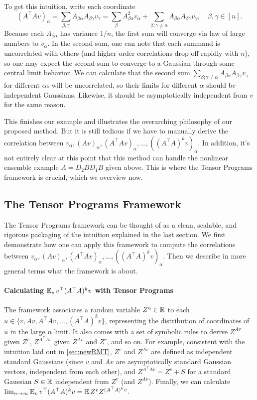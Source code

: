 \documentclass{article}
\theoremstyle{definition}
\theoremstyle{remark}
\newcommand{\trsp}{\top}
\begin{document}
To get this intuition, write each coordinate 
\begin{equation}(A^{\trsp}Av)_{\alpha}=\sum_{\beta,\gamma}A_{\beta\alpha}A_{\beta\gamma}v_{\gamma}=\sum_{\beta}A_{\beta\alpha}^{2}v_{\alpha}+\sum_{\beta;\gamma\ne\alpha}A_{\beta\alpha}A_{\beta\gamma}v_{\gamma},\quad \beta,\gamma\in[n].
\label{eqn:ATAv}
\end{equation}
Because each $A_{\beta\alpha}$ has variance $1/n$, the first sum will converge via law of large numbers to $v_{\alpha}$. In the second sum, one can note that each summand is uncorrelated with others (and higher order correlations drop off rapidly with $n$), so one may expect the second sum to converge to a Gaussian through some central limit behavior. We can calculate that the second sum $\sum_{\beta;\gamma\ne\alpha}A_{\beta\alpha}A_{\beta\gamma}v_{\gamma}$ for different $\alpha$s will be uncorrelated, so their limits for different $\alpha$ should be independent Gaussians. Likewise, it should be asymptotically independent from $v$ for the same reason.

This finishes our example and illustrates the overarching philosophy of our proposed method. But it is still tedious if we have to manually derive the correlation between $v_{\alpha},(Av)_{\alpha},(A^{\trsp}Av)_{\alpha},\ldots,((A^{\trsp}A)^{k}v)_{\alpha}$. In addition, it's not entirely clear at this point that this method can handle the nonlinear ensemble example $A=D_{2}BD_{1}B$ given above. This is where the Tensor Programs framework is crucial, which we overview now.

\subsection{The Tensor Programs Framework}

The Tensor Programs framework can be thought of as a clean, scalable, and rigorous packaging of the intuition explained in the last section.
We first demonstrate how one can apply this framework to compute the correlations between $v_{\alpha},(Av)_{\alpha},(A^{\trsp}Av)_{\alpha},\ldots,((A^{\trsp}A)^{k}v)_{\alpha}$.
Then we describe in more general terms what the framework is about.

\paragraph{Calculating $\EV_v v^\trsp (A^\trsp A)^k v$ with Tensor Programs}
The framework associates a random variable $Z^u \in \mathbb{R}$ to each $u \in \{v,Av,A^{\trsp}Av,\ldots,(A^{\trsp}A)^{k}v\}$, representing the distribution of coordinates of $u$ in the large $n$ limit.
It also comes with a set of symbolic rules to derive $Z^{Av}$ given $Z^v$, $Z^{A^\trsp Av}$ given $Z^{Av}$ and $Z^v$, and so on.
For example, consistent with the intuition laid out in \cref{sec:newRMT}, $Z^v$ and $Z^{Av}$ are defined as independent standard Gaussians (since $v$ and $Av$ are asymptotically standard Gaussian vectors, independent from each other), and $Z^{A^\trsp Av} = Z^v + S$ for a standard Gaussian $S \in \mathbb{R}$ independent from $Z^v$ (and $Z^{Av}$).
Finally, we can calculate $\lim_{n\to\infty}\EV_v v^\trsp (A^\trsp A)^k v = \EV Z^v Z^{(A^{\trsp}A)^{k}v}$.
\end{document}
